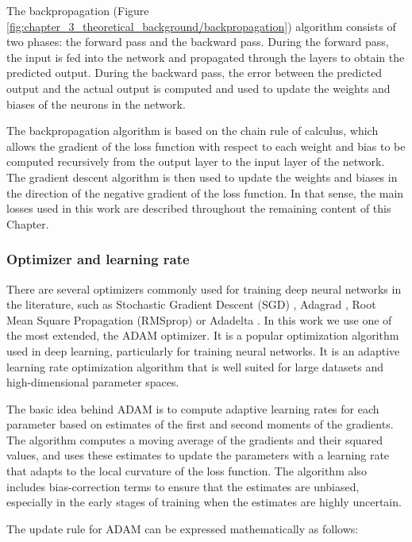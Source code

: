 The backpropagation (Figure \ref{fig:chapter_3_theoretical_background/backpropagation}) algorithm consists of two phases: the forward pass and the backward pass. During the forward pass, the input is fed into the network and propagated through the layers to obtain the predicted output. During the backward pass, the error between the predicted output and the actual output is computed and used to update the weights and biases of the neurons in the network.

The backpropagation algorithm is based on the chain rule of calculus, which allows the gradient of the loss function with respect to each weight and bias to be computed recursively from the output layer to the input layer of the network. The gradient descent algorithm is then used to update the weights and biases in the direction of the negative gradient of the loss function. In that sense, the main losses used in this work are described throughout the remaining content of this Chapter.

\subsubsection{Optimizer and learning rate}
\label{subsubsec:3_optimizer_and_lr}

There are several optimizers commonly used for training deep neural networks in the literature, such as Stochastic Gradient Descent (SGD) \cite{robbins1951stochastic}, Adagrad \cite{duchi2011adaptive}, Root Mean Square Propagation (RMSprop) \cite{zou2019sufficient} or Adadelta \cite{zeiler2012adadelta}. In this work we use one of the most extended, the \ac{ADAM} \cite{kingma2014adam} optimizer. It is a popular optimization algorithm used in deep learning, particularly for training neural networks. It is an adaptive learning rate optimization algorithm that is well suited for large datasets and high-dimensional parameter spaces.

The basic idea behind \ac{ADAM} is to compute adaptive learning rates for each parameter based on estimates of the first and second moments of the gradients. The algorithm computes a moving average of the gradients and their squared values, and uses these estimates to update the parameters with a learning rate that adapts to the local curvature of the loss function. The algorithm also includes bias-correction terms to ensure that the estimates are unbiased, especially in the early stages of training when the estimates are highly uncertain.

The update rule for \ac{ADAM} can be expressed mathematically as follows:


